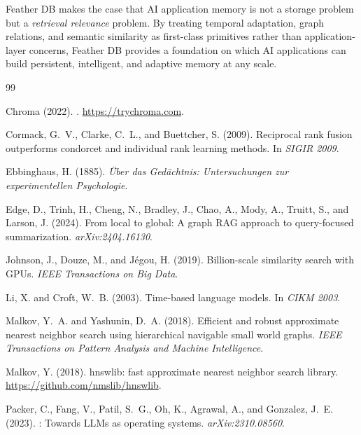 \documentclass[11pt,twocolumn]{article}
\begin{document}
Feather DB makes the case that AI application memory is not a storage problem but
a \emph{retrieval relevance} problem. By treating temporal adaptation, graph
relations, and semantic similarity as first-class primitives rather than
application-layer concerns, Feather DB provides a foundation on which AI
applications can build persistent, intelligent, and adaptive memory at any scale.


\begin{thebibliography}{99}
\small

Chroma (2022).
.
\newblock \url{https://trychroma.com}.

Cormack, G.~V., Clarke, C.~L., and Buettcher, S. (2009).
\newblock Reciprocal rank fusion outperforms condorcet and individual rank
  learning methods.
\newblock In \emph{SIGIR 2009}.

Ebbinghaus, H. (1885).
\newblock \emph{{\"U}ber das Ged{\"a}chtnis: Untersuchungen zur
  experimentellen Psychologie}.

Edge, D., Trinh, H., Cheng, N., Bradley, J., Chao, A., Mody, A., Truitt, S.,
  and Larson, J. (2024).
\newblock From local to global: A graph {RAG} approach to query-focused
  summarization.
\newblock \emph{arXiv:2404.16130}.

Johnson, J., Douze, M., and J{\'e}gou, H. (2019).
\newblock Billion-scale similarity search with {GPU}s.
\newblock \emph{IEEE Transactions on Big Data}.

Li, X. and Croft, W.~B. (2003).
\newblock Time-based language models.
\newblock In \emph{CIKM 2003}.

Malkov, Y.~A. and Yashunin, D.~A. (2018).
\newblock Efficient and robust approximate nearest neighbor search using
  hierarchical navigable small world graphs.
\newblock \emph{IEEE Transactions on Pattern Analysis and Machine Intelligence}.

Malkov, Y. (2018).
\newblock hnswlib: fast approximate nearest neighbor search library.
\newblock \url{https://github.com/nmslib/hnswlib}.

Packer, C., Fang, V., Patil, S.~G., Oh, K., Agrawal, A., and Gonzalez, J.~E.
  (2023).
: Towards {LLM}s as operating systems.
\newblock \emph{arXiv:2310.08560}.


\end{thebibliography}
\end{document}
